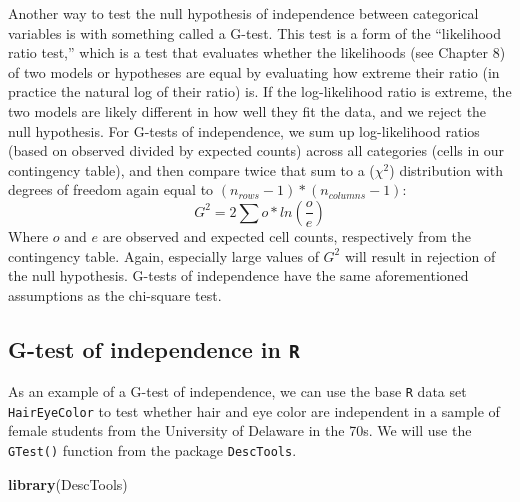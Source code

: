 \documentclass[]{book}
\newenvironment{Shaded}{\begin{snugshade}}{\end{snugshade}}
\newcommand{\CommentTok}[1]{\textcolor[rgb]{0.56,0.35,0.01}{\textit{#1}}}
\newcommand{\DataTypeTok}[1]{\textcolor[rgb]{0.13,0.29,0.53}{#1}}
\newcommand{\DecValTok}[1]{\textcolor[rgb]{0.00,0.00,0.81}{#1}}
\newcommand{\KeywordTok}[1]{\textcolor[rgb]{0.13,0.29,0.53}{\textbf{#1}}}
\newcommand{\NormalTok}[1]{#1}
\newcommand{\OperatorTok}[1]{\textcolor[rgb]{0.81,0.36,0.00}{\textbf{#1}}}
\newcommand{\StringTok}[1]{\textcolor[rgb]{0.31,0.60,0.02}{#1}}
\begin{document}
Another way to test the null hypothesis of independence between categorical variables is with something called a G-test. This test is a form of the ``likelihood ratio test,'' which is a test that evaluates whether the likelihoods (see Chapter 8) of two models or hypotheses are equal by evaluating how extreme their ratio (in practice the natural log of their ratio) is. If the log-likelihood ratio is extreme, the two models are likely different in how well they fit the data, and we reject the null hypothesis. For G-tests of independence, we sum up log-likelihood ratios (based on observed divided by expected counts) across all categories (cells in our contingency table), and then compare twice that sum to a (\(\chi^2\)) distribution with degrees of freedom again equal to \((n_{rows}-1)*(n_{columns}-1)\):
\[G^2=2\sum{o*ln(\frac{o}{e})}\]
Where \(o\) and \(e\) are observed and expected cell counts, respectively from the contingency table. Again, especially large values of \(G^2\) will result in rejection of the null hypothesis. G-tests of independence have the same aforementioned assumptions as the chi-square test.

\hypertarget{g-test-of-independence-in-r}{%
\subsection{\texorpdfstring{G-test of independence in \texttt{R}}{G-test of independence in R}}\label{g-test-of-independence-in-r}}

As an example of a G-test of independence, we can use the base \texttt{R} data set \texttt{HairEyeColor} to test whether hair and eye color are independent in a sample of female students from the University of Delaware in the 70s. We will use the \texttt{GTest()} function from the package \texttt{DescTools}.

\begin{Shaded}
\begin{Highlighting}[]
\KeywordTok{library}\NormalTok{(DescTools)}
\end{Highlighting}
\end{Shaded}

\begin{Shaded}
\end{Shaded}
\end{document}
